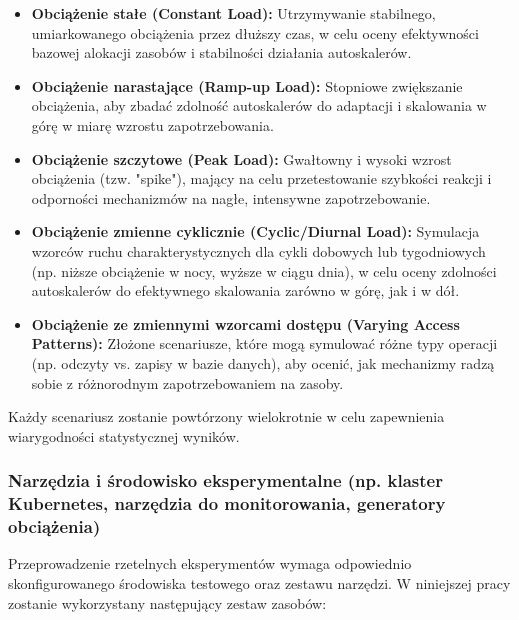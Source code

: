 \begin{itemize}
    \item \textbf{Obciążenie stałe (Constant Load):} Utrzymywanie stabilnego, umiarkowanego obciążenia przez dłuższy czas, w celu oceny efektywności bazowej alokacji zasobów i stabilności działania autoskalerów.
    \item \textbf{Obciążenie narastające (Ramp-up Load):} Stopniowe zwiększanie obciążenia, aby zbadać zdolność autoskalerów do adaptacji i skalowania w górę w miarę wzrostu zapotrzebowania.
    \item \textbf{Obciążenie szczytowe (Peak Load):} Gwałtowny i wysoki wzrost obciążenia (tzw. "spike"), mający na celu przetestowanie szybkości reakcji i odporności mechanizmów na nagłe, intensywne zapotrzebowanie.
    \item \textbf{Obciążenie zmienne cyklicznie (Cyclic/Diurnal Load):} Symulacja wzorców ruchu charakterystycznych dla cykli dobowych lub tygodniowych (np. niższe obciążenie w nocy, wyższe w ciągu dnia), w celu oceny zdolności autoskalerów do efektywnego skalowania zarówno w górę, jak i w dół.
    \item \textbf{Obciążenie ze zmiennymi wzorcami dostępu (Varying Access Patterns):} Złożone scenariusze, które mogą symulować różne typy operacji (np. odczyty vs. zapisy w bazie danych), aby ocenić, jak mechanizmy radzą sobie z różnorodnym zapotrzebowaniem na zasoby.
\end{itemize}
Każdy scenariusz zostanie powtórzony wielokrotnie w celu zapewnienia wiarygodności statystycznej wyników.

\subsubsection{Narzędzia i środowisko eksperymentalne (np. klaster Kubernetes, narzędzia do monitorowania, generatory obciążenia)}
Przeprowadzenie rzetelnych eksperymentów wymaga odpowiednio skonfigurowanego środowiska testowego oraz zestawu narzędzi. W niniejszej pracy zostanie wykorzystany następujący zestaw zasobów:

